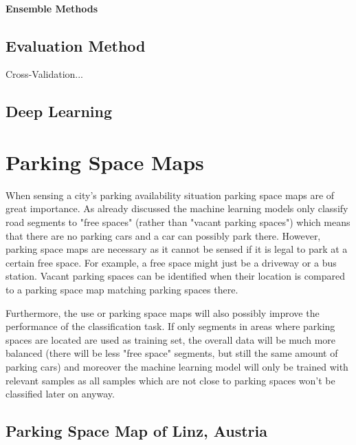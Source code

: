 \paragraph{Ensemble Methods}



\subsection{Evaluation Method}

Cross-Validation...


\subsection{Deep Learning}










\section{Parking Space Maps}

When sensing a city's parking availability situation parking space maps are of great importance. As already discussed the machine learning models only classify road segments to "free spaces" (rather than "vacant parking spaces") which means that there are no parking cars and a car can possibly park there. However, parking space maps are necessary as it cannot be sensed if it is legal to park at a certain free space. For example, a free space might just be a driveway or a bus station. Vacant parking spaces can be identified when their location is compared to a parking space map matching parking spaces there. 

Furthermore, the use or parking space maps will also possibly improve the performance of the classification task. If only segments in areas where parking spaces are located are used as training set, the overall data will be much more balanced (there will be less "free space" segments, but still the same amount of parking cars) and moreover the machine learning model will only be trained with relevant samples as all samples which are not close to parking spaces won't be classified later on anyway.



\subsection{Parking Space Map of Linz, Austria}


